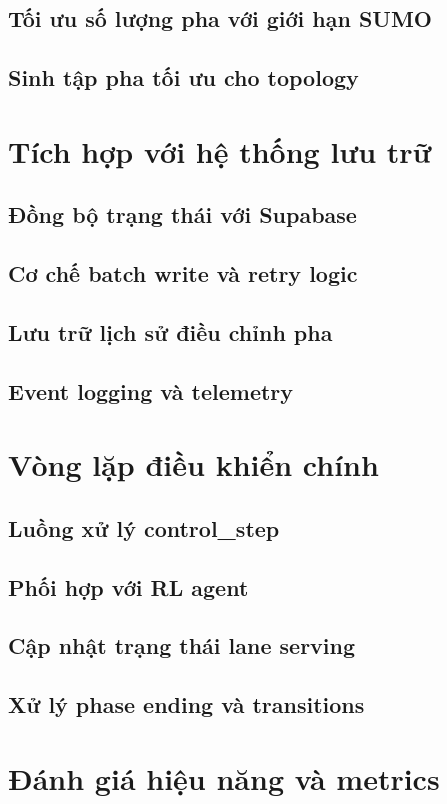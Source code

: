 \subsection{Tối ưu số lượng pha với giới hạn SUMO}
\subsection{Sinh tập pha tối ưu cho topology}

\section{Tích hợp với hệ thống lưu trữ}
\subsection{Đồng bộ trạng thái với Supabase}
\subsection{Cơ chế batch write và retry logic}
\subsection{Lưu trữ lịch sử điều chỉnh pha}
\subsection{Event logging và telemetry}

\section{Vòng lặp điều khiển chính}
\subsection{Luồng xử lý control_step}
\subsection{Phối hợp với RL agent}
\subsection{Cập nhật trạng thái lane serving}
\subsection{Xử lý phase ending và transitions}

\section{Đánh giá hiệu năng và metrics}
